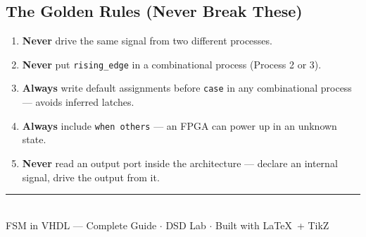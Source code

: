 \documentclass[12pt,a4paper]{article}
\newcommand{\faExclamationTriangle}{\ding{115}}
\begin{document}
\subsection{The Golden Rules (Never Break These)}

\begin{tcolorbox}[errorbox, title={\faExclamationTriangle\ The 5 Rules You Must Never Break}]
  \begin{enumerate}[leftmargin=1.5cm]
    \item \textbf{Never} drive the same signal from two different processes.
    \item \textbf{Never} put \texttt{rising\_edge} in a combinational process
          (Process 2 or 3).
    \item \textbf{Always} write default assignments before \texttt{case} in
          any combinational process --- avoids inferred latches.
    \item \textbf{Always} include \texttt{when others} --- an FPGA can power up
          in an unknown state.
    \item \textbf{Never} read an output port inside the architecture --- declare
          an internal signal, drive the output from it.
  \end{enumerate}
\end{tcolorbox}

\vfill
\begin{center}
  \color{gray}\sffamily\small
  \noindent\rule{0.6\linewidth}{0.4pt}\\[4pt]
  FSM in VHDL --- Complete Guide $\cdot$ DSD Lab $\cdot$
  Built with \LaTeX\ + TikZ
\end{center}
\end{document}
